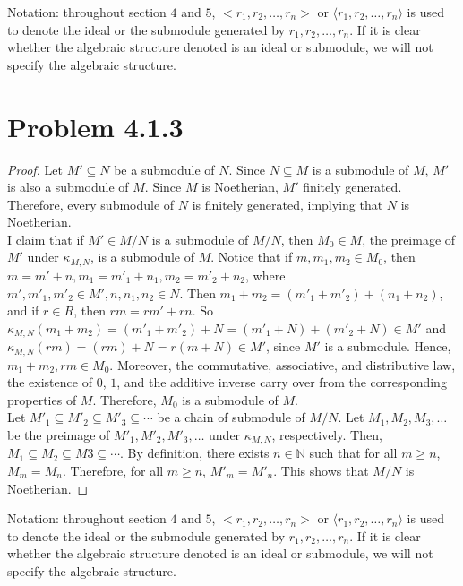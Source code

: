 \documentclass[12pt]{article}
\newcommand{\N}{\mathbb{N}}
\begin{document}
Notation: throughout section $4$ and $5$, $<r_1, r_2, \ldots, r_n>$ or $\langle r_1, r_2, \ldots, r_n \rangle$ is used to denote the ideal or the submodule generated by $r_1, r_2, \ldots, r_n$. If it is clear whether the algebraic structure denoted is an ideal or submodule, we will not specify the algebraic structure.
\newpage 

\section{Problem 4.1.3}

\begin{proof}
	Let $M' \subseteq N$ be a submodule of $N$. Since $N \subseteq M$ is a submodule of $M$, $M'$ is also a submodule of $M$. Since $M$ is Noetherian, $M'$ finitely generated. Therefore, every submodule of $N$ is finitely generated, implying that $N$ is Noetherian. \\
 
    I claim that if $M' \in M/N$ is a submodule of $M/N$, then $M_0 \in M$, the preimage of $M'$ under $\kappa_{M,N}$, is a submodule of $M$. Notice that if $m, m_1, m_2 \in M_0$, then $m = m' + n, m_1 = m'_1 + n_1, m_2 = m'_2 + n_2$, where $m', m'_1, m'_2 \in M', n, n_1, n_2 \in N$. Then $m_1 + m_2 = (m'_1+m'_2) + (n_1+n_2)$, and if $r \in R$, then $rm = rm' + rn$. So $\kappa_{M,N}(m_1+m_2) = (m'_1+m'_2) + N = (m'_1 + N) + (m'_2 + N) \in M'$ and $\kappa_{M,N}(rm) = (rm) + N = r(m+N) \in M'$, since $M'$ is a submodule. Hence, $m_1+m_2, rm \in M_0$. Moreover, the commutative, associative, and distributive law, the existence of $0$, $1$, and the additive inverse carry over from the corresponding properties of $M$. Therefore, $M_0$ is a submodule of $M$. \\

    Let $M'_1 \subseteq M'_2 \subseteq M'_3 \subseteq \cdots$ be a chain of submodule of $M/N$. Let $M_1, M_2, M_3, \ldots$ be the preimage of $M'_1, M'_2, M'_3, \ldots$ under $\kappa_{M,N}$, respectively. Then, $M_1 \subseteq M_2 \subseteq M3 \subseteq \cdots$. By definition, there exists $n \in \N$ such that for all $m \geq n$, $M_m = M_n$. Therefore, for all $m \geq n$, $M'_m = M'_n$. This shows that $M/N$ is Noetherian. 

\end{proof}

Notation: throughout section $4$ and $5$, $<r_1, r_2, \ldots, r_n>$ or $\langle r_1, r_2, \ldots, r_n \rangle$ is used to denote the ideal or the submodule generated by $r_1, r_2, \ldots, r_n$. If it is clear whether the algebraic structure denoted is an ideal or submodule, we will not specify the algebraic structure.
\newpage 
\end{document}

